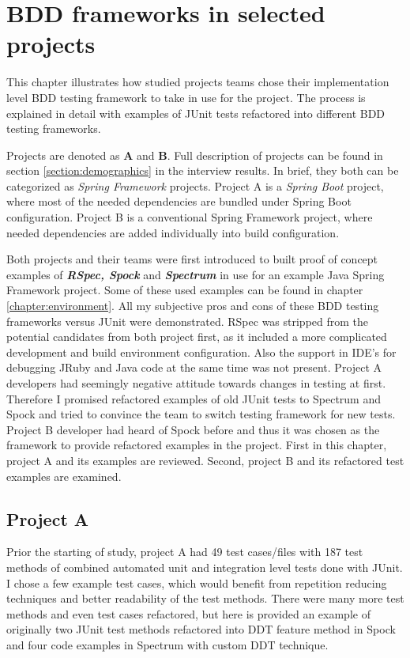 \chapter{BDD frameworks in selected projects}
\label{chapter:projects}

This chapter illustrates how studied projects teams chose their implementation level BDD testing
framework to take in use for the project. The process is explained in detail with examples of JUnit tests
refactored into different BDD testing frameworks.

Projects are denoted as \textbf{A} and \textbf{B}. Full description of projects can be found in section \ref{section:demographics} in the interview
results. In brief, they both can be categorized as \textit{Spring Framework} projects. Project A is a \textit{Spring Boot} project, where
most of the needed dependencies are bundled under Spring Boot configuration. Project B is a conventional Spring Framework project,
where needed dependencies are added individually into build configuration.

Both projects and their teams were first introduced to built proof of concept examples of \textbf{\textit{RSpec, Spock}} and \textbf{\textit{Spectrum}}
in use for an example Java Spring Framework project. Some of these used examples can be found in chapter \ref{chapter:environment}.
All my subjective pros and cons of these BDD testing frameworks versus JUnit were demonstrated. RSpec was stripped from the
potential candidates from both project first, as it included a more complicated development and build environment configuration. Also
the support in IDE's for debugging JRuby and Java code at the same time was not present. Project A developers had
seemingly negative attitude towards changes in testing at first. Therefore I promised refactored examples of old JUnit
tests to Spectrum and Spock and tried to convince the team to switch testing framework for new tests.
Project B developer had heard of Spock before and thus it was chosen as the framework to provide refactored examples in the project.
First in this chapter, project A and its examples are reviewed. Second, project B and its refactored test examples are examined.

\label{section:teams}

    \section{Project A}
    Prior the starting of study, project A had 49 test cases/files with 187 test methods of combined automated unit and integration level tests done with JUnit.
    I chose a few example test cases, which would benefit from repetition reducing techniques and better readability of the test methods.
    There were many more test methods and even test cases refactored, but here is provided an example of originally two JUnit
    test methods refactored into DDT feature method in Spock and four code examples in Spectrum with custom DDT technique.

